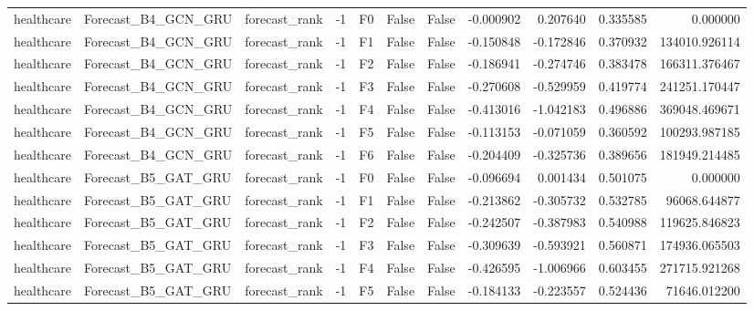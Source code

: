 \begin{tabular}{lllrlllrrrr}
healthcare &          Forecast\_B4\_GCN\_GRU & forecast\_rank &    -1 &  F0 &           False &            False & -0.000902 &  0.207640 & 0.335585 &         0.000000 \\
healthcare &          Forecast\_B4\_GCN\_GRU & forecast\_rank &    -1 &  F1 &           False &            False & -0.150848 & -0.172846 & 0.370932 &    134010.926114 \\
healthcare &          Forecast\_B4\_GCN\_GRU & forecast\_rank &    -1 &  F2 &           False &            False & -0.186941 & -0.274746 & 0.383478 &    166311.376467 \\
healthcare &          Forecast\_B4\_GCN\_GRU & forecast\_rank &    -1 &  F3 &           False &            False & -0.270608 & -0.529959 & 0.419774 &    241251.170447 \\
healthcare &          Forecast\_B4\_GCN\_GRU & forecast\_rank &    -1 &  F4 &           False &            False & -0.413016 & -1.042183 & 0.496886 &    369048.469671 \\
healthcare &          Forecast\_B4\_GCN\_GRU & forecast\_rank &    -1 &  F5 &           False &            False & -0.113153 & -0.071059 & 0.360592 &    100293.987185 \\
healthcare &          Forecast\_B4\_GCN\_GRU & forecast\_rank &    -1 &  F6 &           False &            False & -0.204409 & -0.325736 & 0.389656 &    181949.214485 \\
healthcare &          Forecast\_B5\_GAT\_GRU & forecast\_rank &    -1 &  F0 &           False &            False & -0.096694 &  0.001434 & 0.501075 &         0.000000 \\
healthcare &          Forecast\_B5\_GAT\_GRU & forecast\_rank &    -1 &  F1 &           False &            False & -0.213862 & -0.305732 & 0.532785 &     96068.644877 \\
healthcare &          Forecast\_B5\_GAT\_GRU & forecast\_rank &    -1 &  F2 &           False &            False & -0.242507 & -0.387983 & 0.540988 &    119625.846823 \\
healthcare &          Forecast\_B5\_GAT\_GRU & forecast\_rank &    -1 &  F3 &           False &            False & -0.309639 & -0.593921 & 0.560871 &    174936.065503 \\
healthcare &          Forecast\_B5\_GAT\_GRU & forecast\_rank &    -1 &  F4 &           False &            False & -0.426595 & -1.006966 & 0.603455 &    271715.921268 \\
healthcare &          Forecast\_B5\_GAT\_GRU & forecast\_rank &    -1 &  F5 &           False &            False & -0.184133 & -0.223557 & 0.524436 &     71646.012200 \\

\end{tabular}

